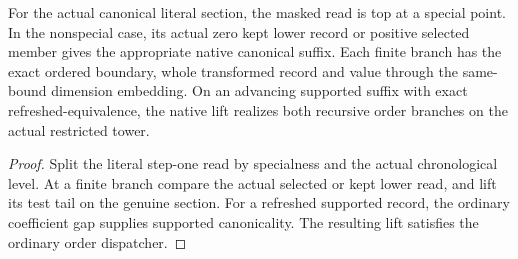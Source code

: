\begin{theorem}
\label{hir:g1-native-literal-phase-dispatch}
\leanok
For the actual canonical literal section, the masked read
is top at a special point. In the nonspecial case, its actual
zero kept lower record or positive selected member gives
the appropriate native canonical suffix. Each finite branch
has the exact ordered boundary, whole transformed record
and value through the same-bound dimension embedding. On
an advancing supported suffix with exact refreshed-equivalence,
the native lift realizes both recursive order branches on the
actual restricted tower.
\end{theorem}
\begin{proof}
Split the literal step-one read by specialness and the
actual chronological level. At a finite branch compare the
actual selected or kept lower read, and lift its test tail
on the genuine section. For a refreshed supported record,
the ordinary coefficient gap supplies supported canonicality.
The resulting lift satisfies the ordinary order dispatcher.
\end{proof}

